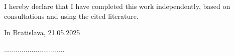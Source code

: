 \thispagestyle{empty}
\vspace*{\fill}
I hereby declare that I have completed this work independently, based on consultations and using the cited literature.
\begin{flushleft}
In Bratislava, 21.05.2025
    \begin{flushright}
        ...............................
    \end{flushright}
    \begin{flushright}

        \myName
    \end{flushright}
\end{flushleft}

\clearpage\null
\thispagestyle{empty}


